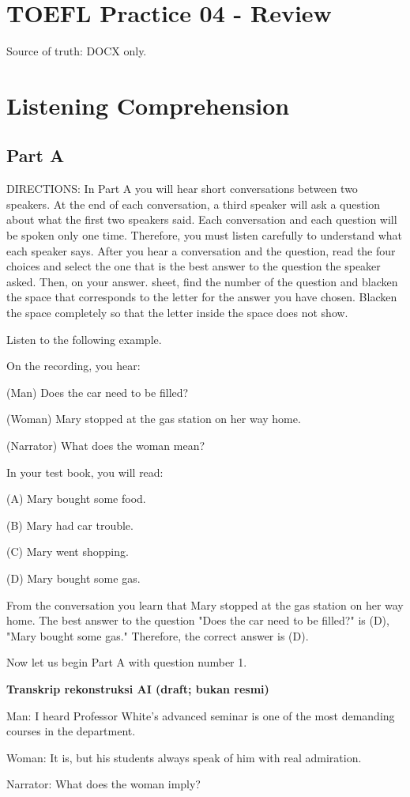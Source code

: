 \documentclass[12pt]{article}
\begin{document}
\section*{TOEFL Practice 04 - Review}
Source of truth: DOCX only.
\section*{Listening Comprehension}
\subsection*{Part A}
DIRECTIONS: In Part A you will hear short conversations between two speakers. At the end of each conversation, a third speaker will ask a question about what the first two speakers said. Each conversation and each question will be spoken only one time. Therefore, you must listen carefully to understand what each speaker says. After you hear a conversation and the question, read the four choices and select the one that is the best answer to the question the speaker asked. Then, on your answer. sheet, find the number of the question and blacken the space that corresponds to the letter for the answer you have chosen. Blacken the space completely so that the letter inside the space does not show.\par
\begin{exampleblock}
Listen to the following example.\par
On the recording, you hear:\par
(Man) Does the car need to be filled?\par
(Woman) Mary stopped at the gas station on her way home.\par
(Narrator) What does the woman mean?\par
In your test book, you will read:\par
(A) Mary bought some food.\par
(B) Mary had car trouble.\par
(C) Mary went shopping.\par
(D) Mary bought some gas.\par
From the conversation you learn that Mary stopped at the gas station on her way home. The best answer to the question "Does the car need to be filled?" is (D), "Mary bought some gas." Therefore, the correct answer is (D).\par
Now let us begin Part A with question number 1.\par
\end{exampleblock}
\begin{exampleblock}
\textbf{Transkrip rekonstruksi AI (draft; bukan resmi)}\par
Man: I heard Professor White's advanced seminar is one of the most demanding courses in the department.\par
Woman: It is, but his students always speak of him with real admiration.\par
Narrator: What does the woman imply?\par
\end{exampleblock}
\end{document}
